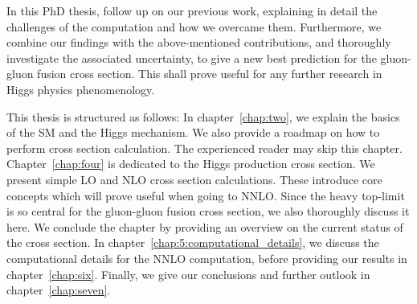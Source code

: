 In this PhD thesis, follow up on our previous work, explaining in detail the challenges of the computation and how we overcame them. Furthermore, we combine our findings with the above-mentioned contributions, and thoroughly investigate the associated uncertainty, to give a new best prediction for the gluon-gluon fusion cross section. This shall prove useful for any further research in Higgs physics phenomenology.

This thesis is structured as follows: In chapter~\ref{chap:two}, we explain the basics of the \acs{SM} and the Higgs mechanism. We also provide a roadmap on how to perform cross section calculation. The experienced reader may skip this chapter. Chapter~\ref{chap:four} is dedicated to the Higgs production cross section. We present simple \acs{LO} and \acs{NLO} cross section calculations. These introduce core concepts which will prove useful when going to \acs{NNLO}. Since the heavy top-limit is so central for the gluon-gluon fusion cross section, we also thoroughly discuss it here. We conclude the chapter by providing an overview on the current status of the cross section. In chapter~\ref{chap:5:computational_details}, we discuss the computational details for the \acs{NNLO} computation, before providing our results in chapter~\ref{chap:six}. Finally, we give our conclusions and further outlook in chapter~\ref{chap:seven}.
